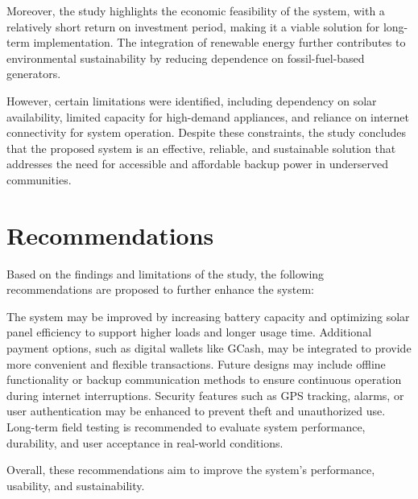 {Moreover, the study highlights the economic feasibility of the system, with a relatively short return on investment period, making it a viable solution for long-term implementation. The integration of renewable energy further contributes to environmental sustainability by reducing dependence on fossil-fuel-based generators.

However, certain limitations were identified, including dependency on solar availability, limited capacity for high-demand appliances, and reliance on internet connectivity for system operation. Despite these constraints, the study concludes that the proposed system is an effective, reliable, and sustainable solution that addresses the need for accessible and affordable backup power in underserved communities.
\newpage
\section{Recommendations}

Based on the findings and limitations of the study, the following recommendations are proposed to further enhance the system:

The system may be improved by increasing battery capacity and optimizing solar panel efficiency to support higher loads and longer usage time.
Additional payment options, such as digital wallets like GCash, may be integrated to provide more convenient and flexible transactions.
Future designs may include offline functionality or backup communication methods to ensure continuous operation during internet interruptions.
Security features such as GPS tracking, alarms, or user authentication may be enhanced to prevent theft and unauthorized use.
Long-term field testing is recommended to evaluate system performance, durability, and user acceptance in real-world conditions.

Overall, these recommendations aim to improve the system’s performance, usability, and sustainability.

}